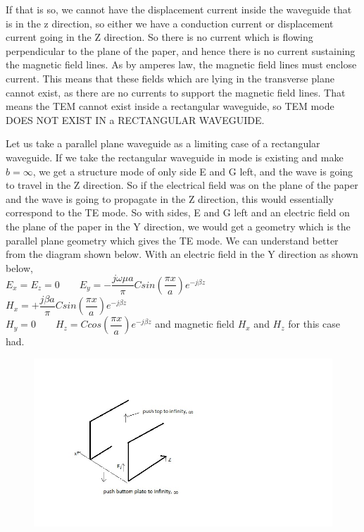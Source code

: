 If that is so, we cannot have the displacement current inside the waveguide that is in the z direction, so either we have a conduction current or displacement current going in the Z direction. So there is no current which is flowing perpendicular to the plane of the paper, and hence there is no current sustaining the magnetic field lines. As by amperes law, the magnetic field lines must enclose current. This means that these fields which are lying in the transverse plane cannot exist, as there are no currents to support the magnetic field lines. That means the TEM cannot exist inside a rectangular waveguide, so TEM mode DOES NOT EXIST IN a RECTANGULAR WAVEGUIDE.

Let us take a parallel plane waveguide as a limiting case of a rectangular waveguide. If we take the rectangular waveguide in mode is existing and make ${b=\infty}$, we get a structure mode of only side E and G left, and the wave is going to travel in the Z direction. So if the electrical field was on the plane of the paper and the wave is going to propagate in the Z direction, this would essentially correspond to the TE mode. So with sides, E and G left and an electric field on the plane of the paper in the Y direction, we would get a geometry which is the parallel plane geometry which gives the TE mode. We can understand better from the diagram shown below.
With an electric field in the Y direction as shown below,\\
${E_x = E_z = 0 \qquad E_y = - \dfrac{j\omega\mu a}{\pi} Csin(\dfrac{\pi x}{a})e^{-j\beta z}}$\\
$H_x = + \dfrac{j\beta a}{\pi} Csin(\dfrac{\pi x}{a})e^{-j\beta z}$\\
$H_y = 0\qquad H_z = Ccos(\dfrac{\pi x}{a})e^{-j\beta z}$ and magnetic field ${H_x}$ and ${H_z}$ for this case had.
\begin{figure}[h]
\centering
\includegraphics[width=.7\linewidth]{./graphics/page3}
\caption{}
\end{figure}
